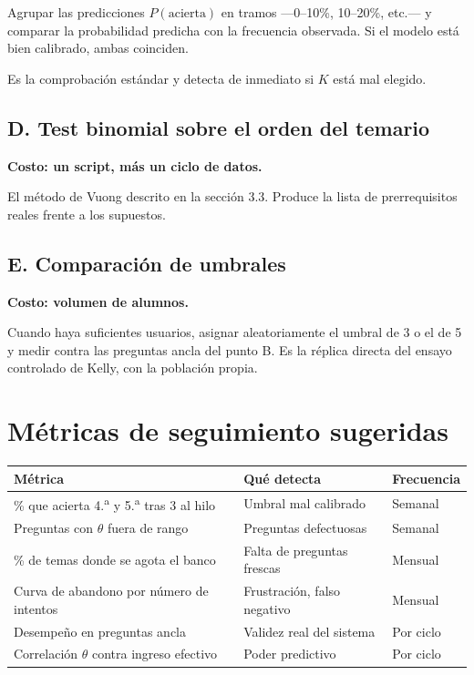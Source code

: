 \documentclass[11pt,a4paper]{article}
\begin{document}
Agrupar las predicciones $P(\text{acierta})$ en tramos ---0--10\%, 10--20\%, etc.--- y comparar la probabilidad predicha con la frecuencia observada. Si el modelo está bien calibrado, ambas coinciden.

Es la comprobación estándar y detecta de inmediato si $K$ está mal elegido.

\subsection{D. Test binomial sobre el orden del temario}

\textbf{Costo: un script, más un ciclo de datos.}

El método de Vuong descrito en la sección 3.3. Produce la lista de prerrequisitos reales frente a los supuestos.

\subsection{E. Comparación de umbrales}

\textbf{Costo: volumen de alumnos.}

Cuando haya suficientes usuarios, asignar aleatoriamente el umbral de 3 o el de 5 y medir contra las preguntas ancla del punto B. Es la réplica directa del ensayo controlado de Kelly, con la población propia.

\section{Métricas de seguimiento sugeridas}

\begin{center}
\small
\begin{tabular}{lll}
\toprule
\textbf{Métrica} & \textbf{Qué detecta} & \textbf{Frecuencia} \\
\midrule
\% que acierta 4.\textsuperscript{a} y 5.\textsuperscript{a} tras 3 al hilo & Umbral mal calibrado & Semanal \\
Preguntas con $\theta$ fuera de rango & Preguntas defectuosas & Semanal \\
\% de temas donde se agota el banco & Falta de preguntas frescas & Mensual \\
Curva de abandono por número de intentos & Frustración, falso negativo & Mensual \\
Desempeño en preguntas ancla & Validez real del sistema & Por ciclo \\
Correlación $\theta$ contra ingreso efectivo & Poder predictivo & Por ciclo \\
\bottomrule
\end{tabular}
\end{center}
\end{document}
